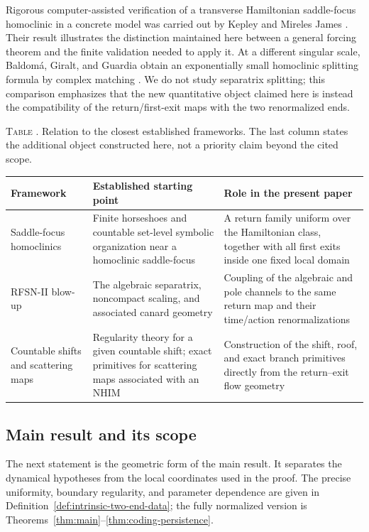 \documentclass[11pt]{amsart}
\numberwithin{equation}{section}
\theoremstyle{definition}
\theoremstyle{remark}
\begin{document}
Rigorous computer-assisted verification of a transverse Hamiltonian
saddle-focus homoclinic in a concrete model was carried out by Kepley and
Mireles James \cite{KepleyMirelesJames2019Chaos}.  Their result illustrates
the distinction maintained here between a general forcing theorem and the
finite validation needed to apply it.  At a different singular scale,
Baldom\'a, Giralt, and Guardia obtain an exponentially small homoclinic
splitting formula by complex matching \cite{BaldomaGiraltGuardia2023L3}.
We do not study separatrix splitting; this comparison emphasizes that the
new quantitative object claimed here is instead the compatibility of the
return/first-exit maps with the two renormalized ends.

\begin{center}
\parbox{\textwidth}{\small\textsc{Table \thetable.}
Relation to the closest established frameworks.  The last column states
the additional object constructed here, not a priority claim beyond the
cited scope.\label{tab:literature-comparison}}
\smallskip
\small
\begin{tabularx}{\textwidth}{@{}p{}YY@{}}
\hline
Framework & Established starting point & Role in the present paper \\
\hline
Saddle-focus homoclinics
& Finite horseshoes and countable set-level symbolic organization near a
homoclinic saddle-focus
& A return family uniform over the Hamiltonian class, together with all first exits
inside one fixed local domain \\
RFSN-II blow-up
& The algebraic separatrix, noncompact scaling, and associated canard
geometry
& Coupling of the algebraic and pole channels to the same return map and
their time/action renormalizations \\
Countable shifts and scattering maps
& Regularity theory for a given countable shift; exact primitives for
scattering maps associated with an NHIM
& Construction of the shift, roof, and exact branch primitives directly
from the return--exit flow geometry \\
\hline
\end{tabularx}
\end{center}

\subsection{Main result and its scope}

The next statement is the geometric form of the main result.  It separates
the dynamical hypotheses from the local coordinates used in the proof.
The precise uniformity, boundary regularity, and parameter dependence are
given in Definition~\ref{def:intrinsic-two-end-data}; the fully normalized
version is Theorems~\ref{thm:main}--\ref{thm:coding-persistence}.
\end{document}
